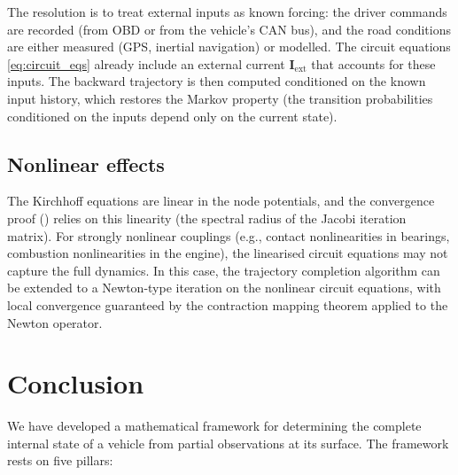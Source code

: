 \documentclass[twocolumn,10pt,a4paper]{article}
\theoremstyle{definition}
\theoremstyle{remark}
\newcommand{\vect}[1]{\boldsymbol{#1}}
\begin{document}
The resolution is to treat external inputs as known forcing: the driver commands are recorded (from OBD or from the vehicle's CAN bus), and the road conditions are either measured (GPS, inertial navigation) or modelled. The circuit equations \eqref{eq:circuit_eqs} already include an external current $\vect{I}_{\mathrm{ext}}$ that accounts for these inputs. The backward trajectory is then computed conditioned on the known input history, which restores the Markov property (the transition probabilities conditioned on the inputs depend only on the current state).

\subsection{Nonlinear effects}

The Kirchhoff equations are linear in the node potentials, and the convergence proof () relies on this linearity (the spectral radius of the Jacobi iteration matrix). For strongly nonlinear couplings (e.g., contact nonlinearities in bearings, combustion nonlinearities in the engine), the linearised circuit equations may not capture the full dynamics. In this case, the trajectory completion algorithm can be extended to a Newton-type iteration on the nonlinear circuit equations, with local convergence guaranteed by the contraction mapping theorem applied to the Newton operator.


\section{Conclusion}\label{sec:conclusion}

We have developed a mathematical framework for determining the complete internal state of a vehicle from partial observations at its surface. The framework rests on five pillars:
\end{document}
